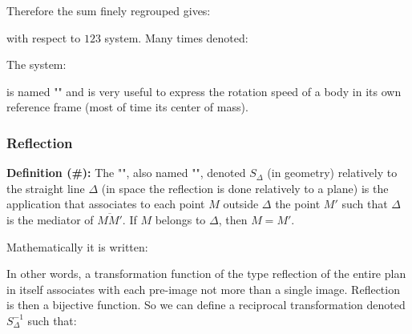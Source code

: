 	Therefore the sum finely regrouped gives:
	
	with respect to $123$ system. Many times denoted:
	
	The system:
	
	is named "" and is very useful to express the rotation speed of a body in its own reference frame (most of time its center of mass).
	
	\pagebreak
	\subsubsection{Reflection}
	\textbf{Definition (\#\mydef):} The "", also named "", denoted $S_\Delta$ (in geometry) relatively to the straight line $\Delta$ (in space the reflection is done relatively to a plane) is the application that associates to each point $M$ outside $\Delta$ the point $M'$ such that $\Delta$ is the mediator of $\overline{MM'}$. If $M$ belongs to $\Delta$, then $M=M'$.

	Mathematically it is written:
	
	In other words, a transformation function of the type reflection of the entire plan in itself associates with each pre-image not more than a single image. Reflection is then a bijective function. So we can define a reciprocal transformation denoted $S_\Delta^{-1}$ such that:
	
